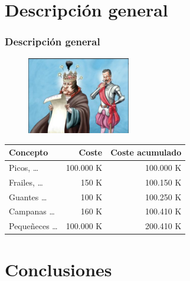 \documentclass{beamer}
\begin{document}
\section{Descripción general}

\begin{frame}
\frametitle{Descripción general}

\begin{figure}
\centering
\includegraphics[width=0.40\textwidth]{cuentas}
\end{figure}

\begin{table}[]
\centering
\begin{tabular}{|l|r|r|}
\hline
Concepto          & Coste     & Coste acumulado \\ \hline
Picos, \ldots     & 100.000 K & 100.000 K \\ \hline
Frailes, \ldots   & 150 K     & 100.150 K \\ \hline
Guantes \dots     & 100 K     & 100.250 K \\ \hline
Campanas \ldots   & 160 K     & 100.410 K \\ \hline
Pequeñeces \ldots & 100.000 K & 200.410 K \\ \hline
\end{tabular}
\end{table}

\end{frame}

\section{Conclusiones}
\end{document}
